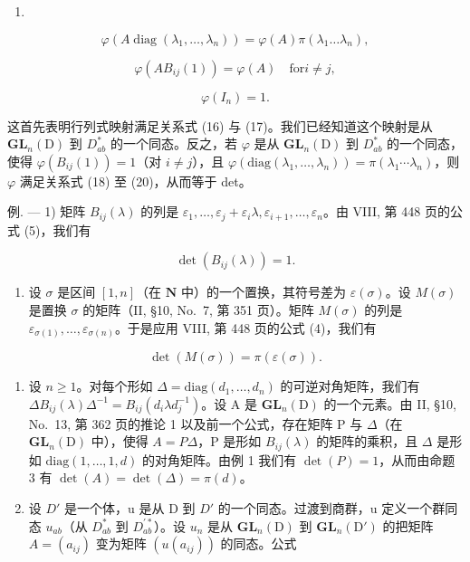 \begin{enumerate}
\def\labelenumi{(\arabic{enumi})}
\setcounter{enumi}{17}
\tightlist
\item
\end{enumerate}

\[
\varphi (A \operatorname{diag} (\lambda_ {1}, \ldots , \lambda_ {n})) = \varphi (A) \pi (\lambda_ {1} \dots \lambda_ {n}),\tag{19}
\]

\[
\varphi (A B _ {i j} (1)) = \varphi (A) \quad \mathrm{for} i \neq j,\tag{20}
\]

\[
\varphi (I _ {n}) = 1.
\]

这首先表明行列式映射满足关系式 (16) 与 (17)。我们已经知道这个映射是从 \(\mathbf{GL}_{n}(\mathrm{D})\) 到 \(D_{ab}^{*}\) 的一个同态。反之，若 \(\varphi\) 是从 \(\mathbf{GL}_{n}(\mathrm{D})\) 到 \(D_{ab}^{*}\) 的一个同态，使得 \(\varphi(B_{ij}(1)) = 1\)（对 \(i \neq j\)），且 \(\varphi(\text{diag}(\lambda_1, \ldots, \lambda_n)) = \pi(\lambda_1 \cdots \lambda_n)\)，则 \(\varphi\) 满足关系式 (18) 至 (20)，从而等于 det。

例. --- 1) 矩阵 \(B_{ij}(\lambda)\) 的列是 \(\varepsilon_1, \ldots, \varepsilon_j + \varepsilon_i \lambda, \varepsilon_{i+1}, \ldots, \varepsilon_n\)。由 VIII, 第 448 页的公式 (5)，我们有

\[
\det (B _ {i j} (\lambda)) = 1.\tag{21}
\]

\begin{enumerate}
\def\labelenumi{\arabic{enumi})}
\setcounter{enumi}{1}
\tightlist
\item
  设 \(\sigma\) 是区间 \([1,n]\)（在 \(\mathbf{N}\) 中）的一个置换，其符号差为 \(\varepsilon(\sigma)\)。设 \(M(\sigma)\) 是置换 \(\sigma\) 的矩阵（II, §10, No.~7, 第 351 页）。矩阵 \(M(\sigma)\) 的列是 \(\varepsilon_{\sigma(1)},\ldots,\varepsilon_{\sigma(n)}\)。于是应用 VIII, 第 448 页的公式 (4)，我们有
\end{enumerate}

\[
\det (M (\sigma)) = \pi (\varepsilon (\sigma)).\tag{22}
\]

\begin{enumerate}
\def\labelenumi{\arabic{enumi})}
\setcounter{enumi}{2}
\item
  设 \(n \geqslant 1\)。对每个形如 \(\Delta = \text{diag}(d_1, \ldots, d_n)\) 的可逆对角矩阵，我们有 \(\Delta B_{ij}(\lambda)\Delta^{-1} = B_{ij}(d_i\lambda d_j^{-1})\)。设 A 是 \(\mathbf{GL}_n(\mathrm{D})\) 的一个元素。由 II, §10, No.~13, 第 362 页的推论 1 以及前一个公式，存在矩阵 P 与 \(\Delta\)（在 \(\mathbf{GL}_n(\mathrm{D})\) 中），使得 \(A = P\Delta\)，P 是形如 \(B_{ij}(\lambda)\) 的矩阵的乘积，且 \(\Delta\) 是形如 \(\text{diag}(1, \ldots, 1, d)\) 的对角矩阵。由例 1 我们有 \(\det(P) = 1\)，从而由命题 3 有 \(\det(A) = \det(\Delta) = \pi(d)\)。
\item
  设 \(D'\) 是一个体，u 是从 D 到 \(D'\) 的一个同态。过渡到商群，u 定义一个群同态 \(u_{ab}\)（从 \(D_{ab}^{*}\) 到 \(D_{ab}^{\prime *}\)）。设 \(u_{n}\) 是从 \(\mathbf{GL}_{n}(\mathrm{D})\) 到 \(\mathbf{GL}_{n}(\mathrm{D}')\) 的把矩阵 \(A = (a_{ij})\) 变为矩阵 \((u(a_{ij}))\) 的同态。公式
\end{enumerate}

